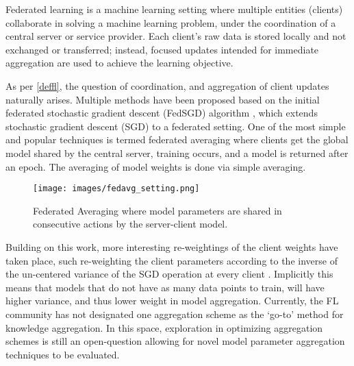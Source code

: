 \begin{definition}\label{deffl}
Federated learning is a machine learning setting where multiple entities (clients) collaborate in solving a machine learning problem, under the coordination of a central server or service provider. Each client’s raw data is stored locally and not exchanged or transferred; instead, focused updates intended for immediate aggregation are used to achieve the learning objective.
\end{definition}

As per \autoref{deffl}, the question of coordination, and aggregation of client updates naturally arises. Multiple methods have been proposed based on the initial federated stochastic gradient descent (FedSGD) algorithm \cite{li2020preserving}, which extends stochastic gradient descent (SGD) to a federated setting. One of the most simple and popular techniques is termed federated averaging where clients get the global model shared by the central server, training occurs, and a model is returned after an epoch. The averaging of model weights is done via simple averaging. 
\begin{figure}[htp]
    \centering
    \texttt{[image: images/fedavg\_setting.png]}
    \caption{Federated Averaging where model parameters are shared in consecutive actions by the server-client model. \cite{konevcny2016federated}}
    \label{fig:fedavg}
\end{figure}

Building on this work, more interesting re-weightings of the client weights have taken place, such re-weighting the client parameters according to the inverse of the un-centered variance of the SGD operation at every client \cite{reyes2021precision}. Implicitly this means that models that do not have as many data points to train, will have higher variance, and thus lower weight in model aggregation. Currently, the FL community has not designated one aggregation scheme as the `go-to' method for knowledge aggregation. In this space, exploration in optimizing aggregation schemes is still an open-question allowing for novel model parameter aggregation techniques to be evaluated. \\



